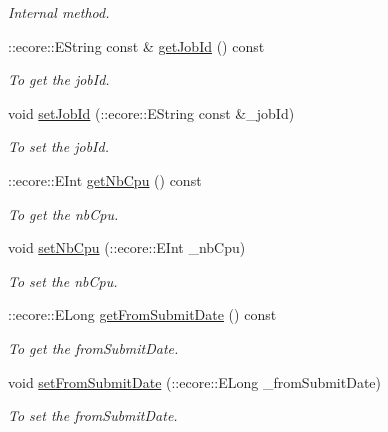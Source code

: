\begin{DoxyCompactItemize}
\begin{DoxyCompactList}\small\item\em Internal method. \item\end{DoxyCompactList}\item 
::ecore::EString const \& \hyperlink{classTMS__Data_1_1ListJobsOptions_a8a12f0dda3744bf11e0208ea38bc1402}{getJobId} () const 
\begin{DoxyCompactList}\small\item\em To get the jobId. \item\end{DoxyCompactList}\item 
void \hyperlink{classTMS__Data_1_1ListJobsOptions_a2fdf79ed139e819f26ea7a8c14321903}{setJobId} (::ecore::EString const \&\_\-jobId)
\begin{DoxyCompactList}\small\item\em To set the jobId. \item\end{DoxyCompactList}\item 
::ecore::EInt \hyperlink{classTMS__Data_1_1ListJobsOptions_af02a6acb45e3b8480ee5eae729011e5c}{getNbCpu} () const 
\begin{DoxyCompactList}\small\item\em To get the nbCpu. \item\end{DoxyCompactList}\item 
void \hyperlink{classTMS__Data_1_1ListJobsOptions_a8678b31f111f64740a1736ad5f1630ec}{setNbCpu} (::ecore::EInt \_\-nbCpu)
\begin{DoxyCompactList}\small\item\em To set the nbCpu. \item\end{DoxyCompactList}\item 
::ecore::ELong \hyperlink{classTMS__Data_1_1ListJobsOptions_ae53ace9fe442284f5ac49b19a4002376}{getFromSubmitDate} () const 
\begin{DoxyCompactList}\small\item\em To get the fromSubmitDate. \item\end{DoxyCompactList}\item 
void \hyperlink{classTMS__Data_1_1ListJobsOptions_a221c38a51589d2f72276b3f77ab2d45a}{setFromSubmitDate} (::ecore::ELong \_\-fromSubmitDate)
\begin{DoxyCompactList}\small\item\em To set the fromSubmitDate. \item\end{DoxyCompactList}\item 

\end{DoxyCompactItemize}
